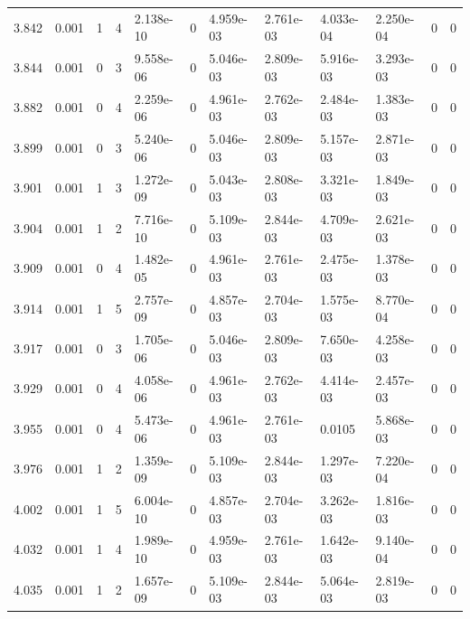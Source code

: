 \documentclass[preview]{standalone}
\begin{document}
{{{{{\begin{tabular}{L{1.2cm}C{1.2cm} C{0.3cm}C{0.5cm} C{1.4cm}C{1.4cm} C{1.4cm}C{1.4cm} C{1.6cm}C{1.6cm} C{1.6cm}C{1.6cm}}
  3.842  &  0.001  & 1     &  4 &  2.138e-10  & 0  &  4.959e-03&   2.761e-03& 4.033e-04 & 2.250e-04   &  0 & 0  \\ 
  3.844  &  0.001  & 0     &  3 &  9.558e-06  & 0  &  5.046e-03&   2.809e-03& 5.916e-03 & 3.293e-03   &  0 & 0  \\ 
  3.882  &  0.001  & 0     &  4 &  2.259e-06  & 0  &  4.961e-03&   2.762e-03& 2.484e-03 & 1.383e-03   &  0 & 0  \\ 
  3.899  &  0.001  & 0     &  3 &  5.240e-06  & 0  &  5.046e-03&   2.809e-03& 5.157e-03 & 2.871e-03   &  0 & 0  \\ 
  3.901  &  0.001  & 1     &  3 &  1.272e-09  & 0  &  5.043e-03&   2.808e-03& 3.321e-03 & 1.849e-03   &  0 & 0  \\ 
  3.904  &  0.001  & 1     &  2 &  7.716e-10  & 0  &  5.109e-03&   2.844e-03& 4.709e-03 & 2.621e-03   &  0 & 0  \\ 
  3.909  &  0.001  & 0     &  4 &  1.482e-05  & 0  &  4.961e-03&   2.761e-03& 2.475e-03 & 1.378e-03   &  0 & 0  \\ 
  3.914  &  0.001  & 1     &  5 &  2.757e-09  & 0  &  4.857e-03&   2.704e-03& 1.575e-03 & 8.770e-04   &  0 & 0  \\ 
  3.917  &  0.001  & 0     &  3 &  1.705e-06  & 0  &  5.046e-03&   2.809e-03& 7.650e-03 & 4.258e-03   &  0 & 0  \\ 
  3.929  &  0.001  & 0     &  4 &  4.058e-06  & 0  &  4.961e-03&   2.762e-03& 4.414e-03 & 2.457e-03   &  0 & 0  \\ 
  3.955  &  0.001  & 0     &  4 &  5.473e-06  & 0  &  4.961e-03&   2.761e-03& 0.0105 & 5.868e-03   &  0 & 0  \\ 
  3.976  &  0.001  & 1     &  2 &  1.359e-09  & 0  &  5.109e-03&   2.844e-03& 1.297e-03 & 7.220e-04   &  0 & 0  \\ 
  4.002  &  0.001  & 1     &  5 &  6.004e-10  & 0  &  4.857e-03&   2.704e-03& 3.262e-03 & 1.816e-03   &  0 & 0  \\ 
  4.032  &  0.001  & 1     &  4 &  1.989e-10  & 0  &  4.959e-03&   2.761e-03& 1.642e-03 & 9.140e-04   &  0 & 0  \\ 
  4.035  &  0.001  & 1     &  2 &  1.657e-09  & 0  &  5.109e-03&   2.844e-03& 5.064e-03 & 2.819e-03   &  0 & 0  \\ 
\hline 
\end{tabular} 

}}}}}
\end{document}
